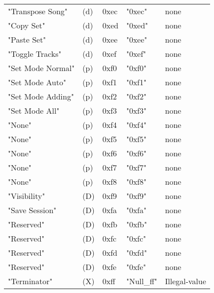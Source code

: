 \begin{table}[htb]
\begin{tabular}{l l l l l}
        "Transpose Song"     & (d)  &  0xec   & "0xec"       & none \\
        "Copy Set"           & (d)  &  0xed   & "0xed"       & none \\
        "Paste Set"          & (d)  &  0xee   & "0xee"       & none \\
        "Toggle Tracks"      & (d)  &  0xef   & "0xef"       & none \\
        "Set Mode Normal"    & (p)  &  0xf0   & "0xf0"       & none \\
        "Set Mode Auto"      & (p)  &  0xf1   & "0xf1"       & none \\
        "Set Mode Adding"    & (p)  &  0xf2   & "0xf2"       & none \\
        "Set Mode All"       & (p)  &  0xf3   & "0xf3"       & none \\
        "None"               & (p)  &  0xf4   & "0xf4"       & none \\
        "None"               & (p)  &  0xf5   & "0xf5"       & none \\
        "None"               & (p)  &  0xf6   & "0xf6"       & none \\
        "None"               & (p)  &  0xf7   & "0xf7"       & none \\
        "None"               & (p)  &  0xf8   & "0xf8"       & none \\
        "Visibility"         & (D)  &  0xf9   & "0xf9"       & none \\
        "Save Session"       & (D)  &  0xfa   & "0xfa"       & none \\
        "Reserved"           & (D)  &  0xfb   & "0xfb"       & none \\
        "Reserved"           & (D)  &  0xfc   & "0xfc"       & none \\
        "Reserved"           & (D)  &  0xfd   & "0xfd"       & none \\
        "Reserved"           & (D)  &  0xfe   & "0xfe"       & none \\
        "Terminator"         & (X)  &  0xff   & "Null\_ff"   &  Illegal-value \\
      \end{tabular}
   \end{table}

